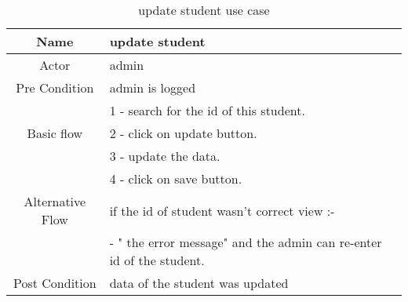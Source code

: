\documentclass{article}
\begin{document}
	\begin{table}[!h]
		
		\caption{update student use case }
		\centering
		\label{updateStudentfunction}
		
		\begin{tabular}{|c|l|}
		
			\hline
			Name                 & update student \\
			\hline
			Actor                & admin   \\
			\hline
			Pre Condition        & admin is logged \\
			\hline
			                     &  1 - search for the id of this student. \\
			Basic flow           &  2 - click on update button. \\
		                         &  3 - update the data.\\
		                         &  4 - click on save button.\\
			\hline
			
			Alternative Flow    & if the id of student wasn't correct view  :-\\
			                    & - " the error message" and the admin can  re-enter id of the student. \\
			\hline
			
			Post Condition      &  data of the student was updated\\
			
			\hline
			
		\end{tabular}
		
	\end{table}
	
\end{document}
